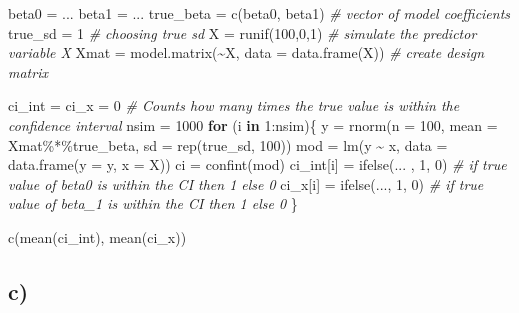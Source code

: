 \documentclass[
]{article}
\newenvironment{Shaded}{\begin{snugshade}}{\end{snugshade}}
\newcommand{\AttributeTok}[1]{\textcolor[rgb]{0.77,0.63,0.00}{#1}}
\newcommand{\CommentTok}[1]{\textcolor[rgb]{0.56,0.35,0.01}{\textit{#1}}}
\newcommand{\ControlFlowTok}[1]{\textcolor[rgb]{0.13,0.29,0.53}{\textbf{#1}}}
\newcommand{\DecValTok}[1]{\textcolor[rgb]{0.00,0.00,0.81}{#1}}
\newcommand{\FunctionTok}[1]{\textcolor[rgb]{0.00,0.00,0.00}{#1}}
\newcommand{\NormalTok}[1]{#1}
\newcommand{\OtherTok}[1]{\textcolor[rgb]{0.56,0.35,0.01}{#1}}
\newcommand{\SpecialCharTok}[1]{\textcolor[rgb]{0.00,0.00,0.00}{#1}}
\begin{document}
\begin{Shaded}
\begin{Highlighting}[]
\NormalTok{beta0 }\OtherTok{=}\NormalTok{ ...}
\NormalTok{beta1 }\OtherTok{=}\NormalTok{ ...}
\NormalTok{true\_beta }\OtherTok{=} \FunctionTok{c}\NormalTok{(beta0, beta1) }\CommentTok{\# vector of model coefficients}
\NormalTok{true\_sd }\OtherTok{=} \DecValTok{1} \CommentTok{\# choosing true sd}
\NormalTok{X }\OtherTok{=} \FunctionTok{runif}\NormalTok{(}\DecValTok{100}\NormalTok{,}\DecValTok{0}\NormalTok{,}\DecValTok{1}\NormalTok{) }\CommentTok{\# simulate the predictor variable X}
\NormalTok{Xmat }\OtherTok{=} \FunctionTok{model.matrix}\NormalTok{(}\SpecialCharTok{\textasciitilde{}}\NormalTok{X, }\AttributeTok{data =} \FunctionTok{data.frame}\NormalTok{(X)) }\CommentTok{\# create design matrix}


\NormalTok{ci\_int }\OtherTok{=}\NormalTok{ ci\_x }\OtherTok{=} \DecValTok{0} \CommentTok{\# Counts how many times the true value is within the confidence interval}
\NormalTok{nsim }\OtherTok{=} \DecValTok{1000}
\ControlFlowTok{for}\NormalTok{ (i }\ControlFlowTok{in} \DecValTok{1}\SpecialCharTok{:}\NormalTok{nsim)\{}
\NormalTok{  y }\OtherTok{=} \FunctionTok{rnorm}\NormalTok{(}\AttributeTok{n =} \DecValTok{100}\NormalTok{, }\AttributeTok{mean =}\NormalTok{ Xmat}\SpecialCharTok{\%*\%}\NormalTok{true\_beta, }\AttributeTok{sd =} \FunctionTok{rep}\NormalTok{(true\_sd, }\DecValTok{100}\NormalTok{))}
\NormalTok{  mod }\OtherTok{=} \FunctionTok{lm}\NormalTok{(y }\SpecialCharTok{\textasciitilde{}}\NormalTok{ x, }\AttributeTok{data =} \FunctionTok{data.frame}\NormalTok{(}\AttributeTok{y =}\NormalTok{ y, }\AttributeTok{x =}\NormalTok{ X))}
\NormalTok{  ci }\OtherTok{=} \FunctionTok{confint}\NormalTok{(mod)}
\NormalTok{  ci\_int[i] }\OtherTok{=} \FunctionTok{ifelse}\NormalTok{(... , }\DecValTok{1}\NormalTok{, }\DecValTok{0}\NormalTok{) }\CommentTok{\# if true value of beta0 is within the CI then 1 else 0}
\NormalTok{  ci\_x[i] }\OtherTok{=} \FunctionTok{ifelse}\NormalTok{(..., }\DecValTok{1}\NormalTok{, }\DecValTok{0}\NormalTok{) }\CommentTok{\# if true value of beta\_1 is within the CI then 1 else 0}
\NormalTok{\}}

\FunctionTok{c}\NormalTok{(}\FunctionTok{mean}\NormalTok{(ci\_int), }\FunctionTok{mean}\NormalTok{(ci\_x))}
\end{Highlighting}
\end{Shaded}

\hypertarget{c-1}{%
\subsection{c)}\label{c-1}}
\end{document}
